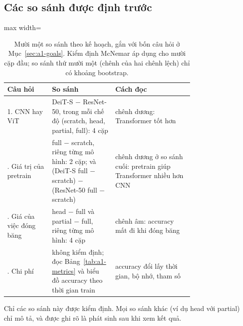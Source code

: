 \subsection{Các so sánh được định trước}
\begin{table}[htbp]
\centering
\caption{Mười một so sánh theo kế hoạch, gắn với bốn câu hỏi ở Mục~\ref{sec:a1-goals}. Kiểm định McNemar áp dụng cho mười cặp đầu; so sánh thứ mười một (chênh của hai chênh lệch) chỉ có khoảng bootstrap.}
\label{tab:a1-compare}
\small
\begin{adjustbox}{max width=\linewidth}
\begin{tabular}{lp{0.34\linewidth}p{0.42\linewidth}}
\toprule
Câu hỏi & So sánh & Cách đọc \\
\midrule
1. CNN hay ViT & DeiT-S \(-\) ResNet-50, trong mỗi chế độ (scratch, head, partial, full): 4 cặp & chênh dương: Transformer tốt hơn \\
\addlinespace
2. Giá trị của pretrain & full \(-\) scratch, riêng từng mô hình: 2 cặp; và (DeiT-S full \(-\) scratch) \(-\) (ResNet-50 full \(-\) scratch) & chênh dương ở so sánh cuối: pretrain giúp Transformer nhiều hơn CNN \\
\addlinespace
3. Giá của việc đóng băng & head \(-\) full và partial \(-\) full, riêng từng mô hình: 4 cặp & chênh âm: accuracy mất đi khi đóng băng \\
\addlinespace
4. Chi phí & không kiểm định; đọc Bảng~\ref{tab:a1-metrics} và biểu đồ accuracy theo thời gian train & accuracy đổi lấy thời gian, bộ nhớ, tham số \\
\bottomrule
\end{tabular}
\end{adjustbox}
\end{table}

Chỉ các so sánh này được kiểm định. Mọi so sánh khác (ví dụ head với partial) chỉ mô tả, và được ghi rõ là phát sinh sau khi xem kết quả.

